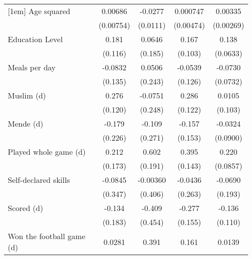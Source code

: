 {\begin{tabular}{l*{4}{c}}
[1em]
Age squared         &     0.00686         &     -0.0277\sym{**} &    0.000747         &     0.00335         \\
                    &   (0.00754)         &    (0.0111)         &   (0.00474)         &   (0.00269)         \\
[1em]
Education Level     &       0.181         &      0.0646         &       0.167         &       0.138\sym{**} \\
                    &     (0.116)         &     (0.185)         &     (0.103)         &    (0.0633)         \\
[1em]
Meals per day       &     -0.0832         &      0.0506         &     -0.0539         &     -0.0730         \\
                    &     (0.135)         &     (0.243)         &     (0.126)         &    (0.0732)         \\
[1em]
Muslim (d)          &       0.276\sym{**} &     -0.0751         &       0.286\sym{**} &      0.0105         \\
                    &     (0.120)         &     (0.248)         &     (0.122)         &     (0.103)         \\
[1em]
Mende (d)           &      -0.179         &      -0.109         &      -0.157         &     -0.0324         \\
                    &     (0.226)         &     (0.271)         &     (0.153)         &    (0.0900)         \\
[1em]
Played whole game (d)&       0.212         &       0.602\sym{***}&       0.395\sym{***}&       0.220\sym{**} \\
                    &     (0.173)         &     (0.191)         &     (0.143)         &    (0.0857)         \\
[1em]
Self-declared skills&     -0.0845         &    -0.00360         &     -0.0436         &     -0.0690         \\
                    &     (0.347)         &     (0.406)         &     (0.263)         &     (0.193)         \\
[1em]
Scored (d)          &      -0.134         &      -0.409         &      -0.277\sym{*}  &      -0.136         \\
                    &     (0.183)         &     (0.454)         &     (0.155)         &     (0.110)         \\
[1em]
Won the football game (d)&      0.0281         &       0.391\sym{*}  &       0.161         &      0.0139         \\

\end{tabular}}
